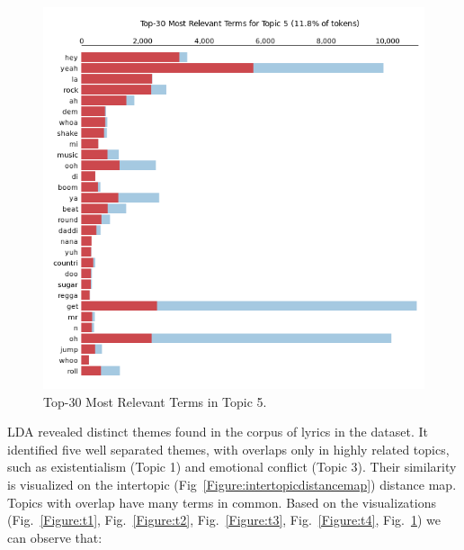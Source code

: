 \begin{center}
\begin{figure}[H]
  \centering
  \includegraphics[width=6in]{img/topics/png/t5.png}
  \caption{Top-30 Most Relevant Terms in Topic 5.}
  \label{Figure:t5}
\end{figure}
\end{center}

LDA revealed distinct themes found in the corpus of  lyrics in the dataset. It
identified five well separated themes, with overlaps only in highly related
topics, such as existentialism (Topic 1) and emotional conflict (Topic 3).
Their similarity is visualized on the intertopic
(Fig~\ref{Figure:intertopicdistancemap}) distance map. Topics with overlap have
many terms in common. Based on the visualizations (Fig.~\ref{Figure:t1},
Fig.~\ref{Figure:t2}, Fig.~\ref{Figure:t3}, Fig.~\ref{Figure:t4},
Fig.~\ref{Figure:t5}) we can observe that:

